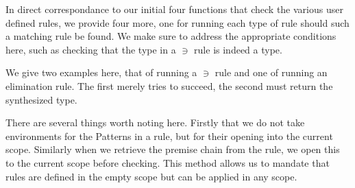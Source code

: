 
In direct correspondance to our initial four functions that check the
various user defined rules, we provide four more, one for running each
type of rule should such a matching rule be found. We make sure to address
the appropriate conditions here, such as checking that the type in a $∋$
rule is indeed a type.

We give two examples here, that of running a $∋$ rule and one of running
an elimination rule. The first merely tries to succeed, the second must
return the synthesized type.

There are several things worth noting here. Firstly that we do not take
environments for the Patterns in a rule, but for their opening into
the current scope. Similarly when we retrieve the premise chain from
the rule, we open this to the current scope before checking. This method
allows us to mandate that rules are defined in the empty scope but can
be applied in any scope.


